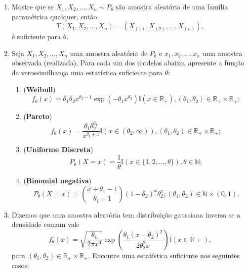 \documentclass[a4paper,10pt, notitlepage]{report}
\newcommand{\rs}{X_1, X_2, \ldots, X_n} %
\newcommand{\rsd}{x_1, x_2, \ldots, x_n} %
\newcommand{\rpl}{\mathbb{R}_+}
\begin{document}
\begin{enumerate}
    \item Mostre que se $\rs \sim P_\theta$ são amostra aleatória de uma família paramétrica qualquer, então
    $$T(\rs) = (X_{(1)}, X_{(2)}, \ldots, X_{(n)}),$$
    é suficiente para $\theta$.
    \item Seja $\rs$ uma amostra aleatória de $P_\theta$ e $\rsd$ uma amostra observada (realizada).
    Para cada um dos modelos abaixo, apresente a função de verossimilhança uma estatística suficiente para $\theta$:
    \begin{enumerate}
        \item (\textbf{Weibull})
        \begin{equation*}
            f_\theta(x) = \theta_1\theta_2 x^{\theta_2-1}\exp\left(-\theta_1 x^{\theta_2}\right)\mathbb{I}(x \in \rpl), (\theta_1, \theta_2) \in \rpl \times \rpl;
        \end{equation*}
        \item (\textbf{Pareto}) 
        \begin{equation*}
            f_\theta(x) = \frac{\theta_1\theta_2^{\theta_1}}{x^{\theta_1 + 1}}\mathbb{I}\left(x \in (\theta_2, \infty)\right), (\theta_1, \theta_2) \in \rpl \times \rpl;
        \end{equation*}
        \item (\textbf{Uniforme Discreta})
        \begin{equation*}
            P_\theta(X = x) = \frac{1}{\theta}\mathbb{I}(x \in \{1, 2, \ldots,\theta\}), \theta \in \mathbb{N};
        \end{equation*}
        \item (\textbf{Binomial negativa})
        \begin{equation*}
            P_\theta(X = x) = \binom{x + \theta_1 - 1}{\theta_1-1}(1-\theta_2)^x \theta_2^x, (\theta_1, \theta_2) \in \mathbb{N} \times (0, 1).
        \end{equation*}
    \end{enumerate}
    \item Dizemos que uma amostra aleatória tem distribuição gaussiana inversa se a densidade comum vale
    \begin{equation*}
        f_\theta(x) = \sqrt{\frac{\theta_1}{2\pi x^3}} \exp\left(\frac{\theta_1(x-\theta_2)^2}{2\theta_2^2x}\right)\mathbb{I}(x \in \mathbb{R}+),
    \end{equation*}
    para $(\theta_1, \theta_2) \in \rpl \times \mathbb{R}_{+}$.
    Encontre uma estatística suficiente nos seguintes casos:

\end{enumerate}
\end{document}
